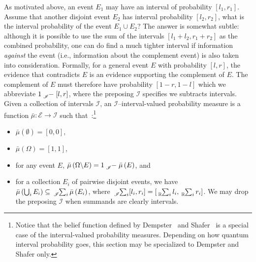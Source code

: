 \documentclass{article}
\theoremstyle{remark}
\newcommand{\events}{\ensuremath{\mathcal{E}}}
\newcommand{\necess}{{\mbox{\wesa{certain}}}}
\begin{document}
As motivated above, an event $E_1$ may have an interval of probability
$[l_1,r_1]$. Assume that another disjoint event $E_2$ has interval
probability $[l_2,r_2]$, what is the interval probability of the event
$E_1 \cup E_2$? The answer is somewhat subtle: although it is possible
to use the sum of the intervals $[l_1+l_2,r_1+r_2]$ as the combined
probability, one can do find a much tighter interval if information
\emph{against} the event (i.e., information about the complement
event) is also taken into consideration. Formally, for a general event
$E$ with probability $[l,r]$, the evidence that
contradicts $E$ is an evidence supporting the complement of $E$. The
complement of $E$ must therefore have probability
$\left[1-r,1-l\right]$ which we abbreviate $1\tensor*[_{\mathscr{I}}]{-}{}\left[l,r\right]$,
where the preposing $\mathscr{I}$ specifies we subtracts intervals. Given
a collection of intervals $\mathscr{I}$, an
$\mathscr{I}$--interval-valued probability measure is a function
$\bar{\mu} : \events \rightarrow \mathscr{I}$ such
that~\cite{JamisonLodwick2004}:\footnote{Notice that the belief function defined by Dempster~\cite{Dempster1967}
and Shafer~\cite{Shafer1976} is a special case of the interval-valued
probability measures. Depending on how quantum interval probability goes, this
section may be specialized to Dempster and Shafer only.}
\begin{itemize}
\item $\bar{\mu}(\emptyset)=[0,0]$, 
\item $\bar{\mu}(\Omega)=[1,1]$, 
\item for any event $E$, $\bar{\mu}\left(\Omega\backslash
E\right)=1\tensor*[_{\mathscr{I}}]{-}{}\bar{\mu}\left(E\right)$, and 
\item for a collection $E_{i}$ of pairwise disjoint events, we have $\bar{\mu}\left(\bigcup_{i}E_{i}\right)\subseteq\tensor*[_{\mathscr{I}}]{\sum}{_{i}}\bar{\mu}\left(E_{i}\right)$,
where $\tensor*[_{\mathscr{I}}]{\sum}{_{i}}[l_{i},r_{i}]=\left[\tensor*[_{\mathbb{R}}]{\sum}{_{i}}l_{i},\tensor*[_{\mathbb{R}}]{\sum}{_{i}}r_{i}\right]$.
We may drop the preposing $\mathscr{I}$ when summands are clearly intervals. 
\end{itemize}

\end{document}
